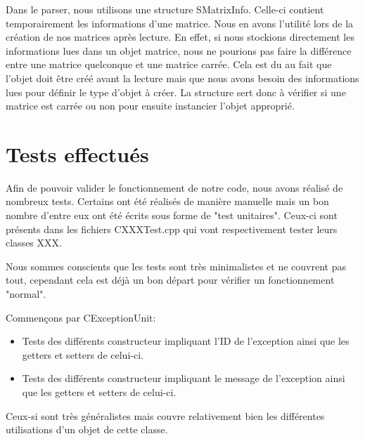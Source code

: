 		
	
		Dans le parser, nous utilisons une structure SMatrixInfo. Celle-ci contient temporairement les informations d'une matrice. Nous en avons l'utilité lors de la création de nos matrices après lecture. En effet, si nous stockions directement les informations lues dans un objet matrice, nous ne pourions pas faire la différence entre une matrice quelconque et une matrice carrée. Cela est du au fait que l'objet doit être créé avant la lecture mais que nous avons besoin des informations lues pour définir le type d'objet à créer. La structure sert donc à vérifier si une matrice est carrée ou non pour ensuite instancier l'objet approprié.
	
	\chapter{Tests effectués}
		Afin de pouvoir valider le fonctionnement de notre code, nous avons réalisé de nombreux tests. Certains ont été réalisés de manière manuelle mais un bon nombre d'entre eux ont été écrits sous forme de "test unitaires". Ceux-ci sont présents dans les fichiers CXXXTest.cpp qui vont respectivement tester leurs classes XXX.
		
		Nous sommes conscients que les tests sont très minimalistes et ne couvrent pas tout, cependant cela est déjà un bon départ pour vérifier un fonctionnement "normal".
		
		Commençons par CExceptionUnit:
		\begin{itemize}
			\item Tests des différents constructeur impliquant l'ID de l'exception ainsi que les getters et setters de celui-ci.
			\item Tests des différents constructeur impliquant le message de l'exception ainsi que les getters et setters de celui-ci.
		\end{itemize}
		Ceux-si sont très généralistes mais couvre relativement bien les différentes utilisations d'un objet de cette classe.
		
